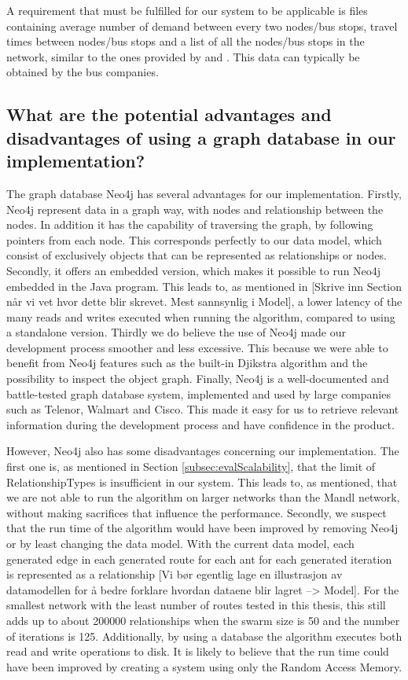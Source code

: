 A requirement that must be fulfilled for our system to be applicable is files containing average number of demand between every two nodes/bus stops, travel times between nodes/bus stops and a list of all the nodes/bus stops in the network, similar to the ones provided by \citet{mandl79} and \citet{mumford13}. This data can typically be obtained by the bus companies.

\subsection*{What are the potential advantages and disadvantages of using a graph database in our implementation?}

The graph database Neo4j has several advantages for our implementation. Firstly, Neo4j represent data in a graph way, with nodes and relationship between the nodes. In addition it has the capability of traversing the graph, by following pointers from each node. This corresponds perfectly to our data model, which consist of exclusively objects that can be represented as relationships or nodes. Secondly, it offers an embedded version, which makes it possible to run Neo4j embedded in the Java program. This leads to, as mentioned in {\color{blue} [Skrive inn Section når vi vet hvor dette blir skrevet. Mest sannsynlig i Model]}, a lower latency of the many reads and writes executed when running the algorithm, compared to using a standalone version. Thirdly we do believe the use of Neo4j made our development process smoother and less excessive. This because we were able to benefit from Neo4j features such as the built-in Djikstra algorithm and the possibility to inspect the object graph. Finally, Neo4j is a well-documented and battle-tested graph database system, implemented and used by large companies such as Telenor\cite{website:telenor}, Walmart\cite{website:walmart} and Cisco\cite{website:cisco}. This made it easy for us to retrieve relevant information during the development process and have confidence in the product. 

However, Neo4j also has some disadvantages concerning our implementation. The first one is, as mentioned in Section \vref{subsec:evalScalability}, that the limit of RelationshipTypes is insufficient in our system. This leads to, as mentioned, that we are not able to run the algorithm on larger networks than the Mandl network, without making sacrifices that influence the performance. Secondly, we suspect that the run time of the algorithm would have been improved by removing Neo4j or by least changing the data model. With the current data model, each generated edge in each generated route for each ant for each generated iteration is represented as a relationship {\color{blue} [Vi bør egentlig lage en illustrasjon av datamodellen for å bedre forklare hvordan dataene blir lagret --> Model]}. For the smallest network with the least number of routes tested in this thesis, this still adds up to about 200000 relationships when the swarm size is 50 and the number of iterations is 125. Additionally, by using a database the algorithm executes both read and write operations to disk. It is likely to believe that the run time could have been improved by creating a system using only the Random Access Memory.  

